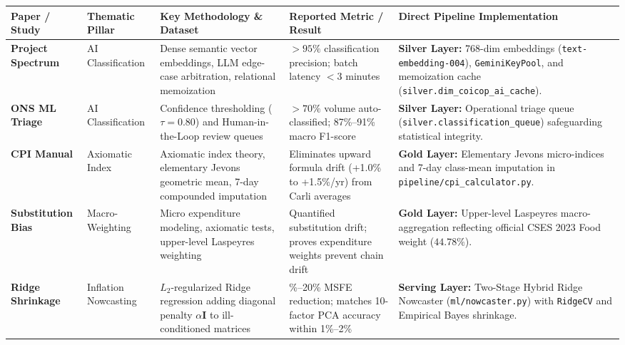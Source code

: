 \begin{table}[H]
\centering
\scriptsize
\setlength{\tabcolsep}{3pt}
\begin{tabularx}{\textwidth}{|>{\raggedright\arraybackslash}p{2.1cm}|>{\centering\arraybackslash}p{1.6cm}|>{\raggedright\arraybackslash}X|>{\raggedright\arraybackslash}p{2.6cm}|>{\raggedright\arraybackslash}X|}
\hline
\rowcolor{blue!20}
\textbf{Paper / Study} & \textbf{Thematic Pillar} & \textbf{Key Methodology \& Dataset} & \textbf{Reported Metric / Result} & \textbf{Direct Pipeline Implementation} \\ \hline
\textbf{Project Spectrum} \citep{bis2024spectrum} & AI Classification & Dense semantic vector embeddings, LLM edge-case arbitration, relational memoization & $>95\%$ classification precision; batch latency $<3$ minutes & \textbf{Silver Layer:} 768-dim embeddings (\texttt{text-embedding-004}), \texttt{GeminiKeyPool}, and memoization cache (\texttt{silver.dim\_coicop\_ai\_cache}). \\ \hline
\textbf{ONS ML Triage} \citep{ons2020clothing} & AI Classification & Confidence thresholding ($\tau = 0.80$) and Human-in-the-Loop review queues & $>70\%$ volume auto-classified; 87\%--91\% macro F1-score & \textbf{Silver Layer:} Operational triage queue (\texttt{silver.classification\_queue}) safeguarding statistical integrity. \\ \hline
\textbf{CPI Manual} \citep{imf2020cpi} & Axiomatic Index & Axiomatic index theory, elementary Jevons geometric mean, 7-day compounded imputation & Eliminates upward formula drift (+1.0\% to +1.5\%/yr) from Carli averages & \textbf{Gold Layer:} Elementary Jevons micro-indices and 7-day class-mean imputation in \texttt{pipeline/cpi\_calculator.py}. \\ \hline
\textbf{Substitution Bias} \citep{diewert2020substitution} & Macro-Weighting & Micro expenditure modeling, axiomatic tests, upper-level Laspeyres weighting & Quantified substitution drift; proves expenditure weights prevent chain drift & \textbf{Gold Layer:} Upper-level Laspeyres macro-aggregation reflecting official CSES 2023 Food weight ($44.78\%$). \\ \hline
\textbf{Ridge Shrinkage} \citep{demol2008forecasting} & Inflation Nowcasting & $L_2$-regularized Ridge regression adding diagonal penalty $\alpha \mathbf{I}$ to ill-conditioned matrices & 10\%--20\% MSFE reduction; matches 10-factor PCA accuracy within 1\%--2\% & \textbf{Serving Layer:} Two-Stage Hybrid Ridge Nowcaster (\texttt{ml/nowcaster.py}) with \texttt{RidgeCV} and Empirical Bayes shrinkage. \\ \hline

\end{tabularx}
\end{table}
